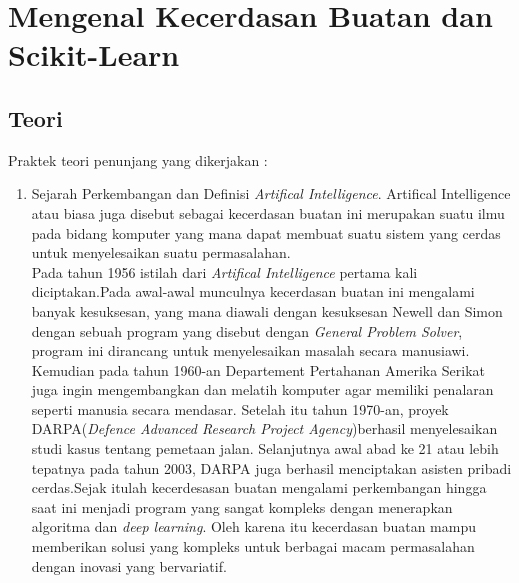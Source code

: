 \chapter{Mengenal Kecerdasan Buatan dan Scikit-Learn}

\section{Teori}
Praktek teori penunjang yang dikerjakan :
\begin{enumerate}
\item Sejarah Perkembangan dan Definisi \textit{Artifical Intelligence}. Artifical Intelligence atau biasa juga disebut sebagai kecerdasan buatan ini merupakan suatu ilmu pada bidang komputer yang mana dapat membuat suatu sistem yang cerdas untuk menyelesaikan suatu permasalahan.\\
Pada tahun 1956 istilah dari \textit{Artifical Intelligence} pertama kali diciptakan.Pada awal-awal munculnya kecerdasan buatan ini mengalami banyak kesuksesan, yang mana diawali dengan kesuksesan Newell dan Simon dengan sebuah program yang disebut dengan \textit{General Problem Solver}, program ini dirancang untuk menyelesaikan masalah secara manusiawi. Kemudian pada tahun 1960-an Departement Pertahanan Amerika Serikat juga ingin mengembangkan dan melatih komputer agar memiliki penalaran seperti manusia secara mendasar. Setelah itu tahun 1970-an, proyek DARPA(\textit{Defence Advanced Research Project Agency})berhasil menyelesaikan studi kasus tentang pemetaan jalan. Selanjutnya awal abad ke 21 atau lebih tepatnya pada tahun 2003, DARPA juga berhasil menciptakan asisten pribadi cerdas.Sejak itulah kecerdesasan buatan mengalami perkembangan hingga saat ini menjadi program yang sangat kompleks dengan menerapkan algoritma dan \textit{deep learning}. Oleh karena itu kecerdasan buatan mampu memberikan solusi yang kompleks untuk berbagai macam permasalahan dengan inovasi yang bervariatif.


\end{enumerate}
